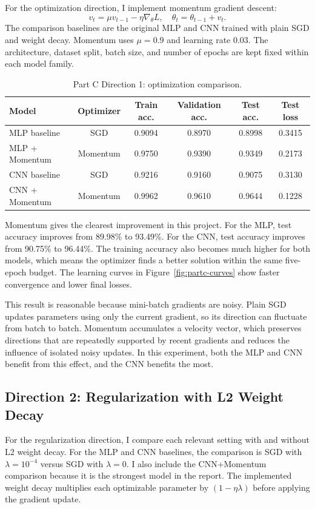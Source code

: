 \documentclass[11pt]{article}
\begin{document}
For the optimization direction, I implement momentum gradient descent:
\[
v_t = \mu v_{t-1} - \eta \nabla_\theta L,\quad
\theta_t = \theta_{t-1}+v_t.
\]
The comparison baselines are the original MLP and CNN trained with plain SGD and weight decay. Momentum uses $\mu=0.9$ and learning rate 0.03. The architecture, dataset split, batch size, and number of epochs are kept fixed within each model family.

\begin{table}[H]
\centering
\caption{Part C Direction 1: optimization comparison.}
\label{tab:momentum}
\begin{tabular}{lccccc}
\toprule
Model & Optimizer & Train acc. & Validation acc. & Test acc. & Test loss \\
\midrule
MLP baseline & SGD & 0.9094 & 0.8970 & 0.8998 & 0.3415 \\
MLP + Momentum & Momentum & 0.9750 & 0.9390 & 0.9349 & 0.2173 \\
CNN baseline & SGD & 0.9216 & 0.9160 & 0.9075 & 0.3130 \\
CNN + Momentum & Momentum & 0.9962 & 0.9610 & 0.9644 & 0.1228 \\
\bottomrule
\end{tabular}
\end{table}

Momentum gives the clearest improvement in this project. For the MLP, test accuracy improves from 89.98\% to 93.49\%. For the CNN, test accuracy improves from 90.75\% to 96.44\%. The training accuracy also becomes much higher for both models, which means the optimizer finds a better solution within the same five-epoch budget. The learning curves in Figure~\ref{fig:partc-curves} show faster convergence and lower final losses.

This result is reasonable because mini-batch gradients are noisy. Plain SGD updates parameters using only the current gradient, so its direction can fluctuate from batch to batch. Momentum accumulates a velocity vector, which preserves directions that are repeatedly supported by recent gradients and reduces the influence of isolated noisy updates. In this experiment, both the MLP and CNN benefit from this effect, and the CNN benefits the most.

\subsection{Direction 2: Regularization with L2 Weight Decay}

For the regularization direction, I compare each relevant setting with and without L2 weight decay. For the MLP and CNN baselines, the comparison is SGD with $\lambda=10^{-4}$ versus SGD with $\lambda=0$. I also include the CNN+Momentum comparison because it is the strongest model in the report. The implemented weight decay multiplies each optimizable parameter by $(1-\eta\lambda)$ before applying the gradient update.
\end{document}
